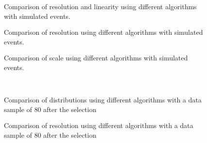 \begin{figure}
\caption{Comparison of \met resolution and linearity using different \met algorithms with simulated \Wen events.} \label{fig:mc_algs_met_resolution_wenu}
\end{figure}

\begin{figure}
\caption{Comparison of \met resolution using different \met algorithms with simulated \Zmm events.} \label{fig:mc_algs_met_resolution_zmumu}
\end{figure}

\begin{figure}
\caption{Comparison of \met scale using different \met algorithms with simulated \Zmm events.} \label{fig:mc_algs_met_scale_zmumu}
\end{figure}

\begin{figure}
\caption{Comparison of \met distributions using different \met algorithms with a data sample of 80 \ipb after the \Zmm selection} \label{fig:data_algs_met_zmumu}
 \\
\end{figure}


\begin{figure}
\caption{Comparison of \met resolution using different \met algorithms with a data sample of 80 \ipb after the \Zmm selection} \label{fig:data_algs_met_resolution_zmumu}
\end{figure}
